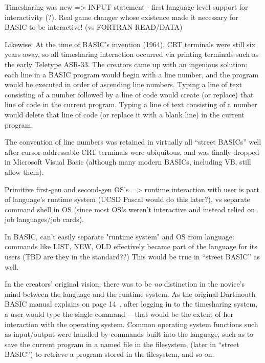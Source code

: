 \documentclass{article}
\begin{document}
Timesharing was new => INPUT statement - first language-level support for
   interactivity  (?).  Real game changer whose existence made it necessary
for BASIC to be interactive!  (vs FORTRAN READ/DATA)


Likewise: At the time of BASIC's invention (1964), CRT terminals were still six
years away, so all timesharing interaction occurred via printing
terminals such as the early Teletype ASR-33.
The creators came up with an ingenious solution: each line in a BASIC
program would begin with a line number, and the program would be
executed in order of ascending line numbers.
Typing a line of text consisting of a number followed by a line of code
would create (or replace) that line of code in the current program.
Typing a line of text consisting of a number would delete that line of
code (or replace it with a blank line) in the current program.
  \begin{geeknote}
  The convention of line numbers was retained in virtually all ``street
  BASICs'' well after cursor-addressable CRT terminals were ubiquitous,
  and was finally dropped in Microsoft Visual Basic (although many modern
  BASICs, including VB, still allow them).
  \end{geeknote}


Primitive first-gen and second-gen OS's => runtime interaction with user
is part of language's runtime system (UCSD Pascal would do this later?),
vs separate command shell in OS (since most OS's weren't interactive and
instead relied on job languages/job cards).

In BASIC, can't easily separate "runtime system" and OS from language: commands
like LIST, NEW, OLD effectively became part of the language for its
users (TBD are they in the standard??)  This would be true in ``street
BASIC'' as well.

In the
creators' original vision, there was to be \emph{no} distinction in the
novice's mind between the language and the runtime system.  As the
original Dartmouth BASIC manual explains on page
14~\cite{dartmouth_basic_manual}, after logging in to the timesharing
system, a user would type the single command ---that would be the
extent of her interaction with the operating system.  Common operating
system functions such as input/output were handled by commands built
into the language, such as  to save the current program in a
named file in the filesystem,  (later  in ``street
BASIC'') to retrieve a program stored in the filesystem, and so on.
\end{document}
